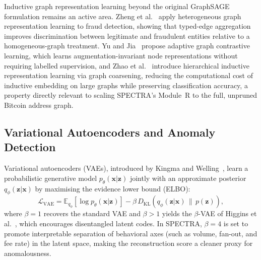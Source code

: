 \documentclass[journal]{IEEEtran}
\newcommand{\spectra}{\textsc{SPECTRA}}
\begin{document}
Inductive graph representation learning beyond the original GraphSAGE
formulation remains an active area.  Zheng et al.~\cite{Zheng2023} apply
heterogeneous graph representation learning to fraud detection, showing that
typed-edge aggregation improves discrimination between legitimate and
fraudulent entities relative to a homogeneous-graph treatment.  Yu and
Jia~\cite{Yu2024} propose adaptive graph contrastive learning, which learns
augmentation-invariant node representations without requiring labelled
supervision, and Zhao et al.~\cite{Zhao2025} introduce hierarchical inductive
representation learning via graph coarsening, reducing the computational cost
of inductive embedding on large graphs while preserving classification
accuracy, a property directly relevant to scaling \spectra{}'s Module~R to
the full, unpruned Bitcoin address graph.

\subsection{Variational Autoencoders and Anomaly Detection}
\label{subsec:vae_related}

Variational autoencoders (VAEs), introduced by Kingma and Welling~\cite{Kingma2014},
learn a probabilistic generative model $p_\theta(\mathbf{x}|\mathbf{z})$ jointly
with an approximate posterior $q_\phi(\mathbf{z}|\mathbf{x})$ by maximising the
evidence lower bound (ELBO):
\begin{equation}
  \mathcal{L}_{\text{VAE}} =
      \mathbb{E}_{q_\phi}\!\left[\log p_\theta(\mathbf{x}|\mathbf{z})\right]
      - \beta\,D_{\mathrm{KL}}\!\left(q_\phi(\mathbf{z}|\mathbf{x}) \,\|\,
        p(\mathbf{z})\right),
  \label{eq:elbo_related}
\end{equation}
where $\beta=1$ recovers the standard VAE and $\beta > 1$ yields the
$\beta$-VAE of Higgins et al.~\cite{Higgins2017}, which encourages
disentangled latent codes.  In \spectra{}, $\beta = 4$ is set to promote
interpretable separation of behavioral axes (such as volume, fan-out, and
fee rate) in the latent space, making the reconstruction score a cleaner
proxy for anomalousness.
\end{document}
